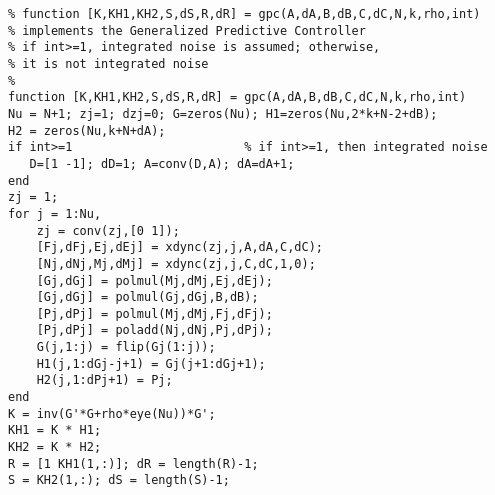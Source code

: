 \begin{verbatim}
% function [K,KH1,KH2,S,dS,R,dR] = gpc(A,dA,B,dB,C,dC,N,k,rho,int)
% implements the Generalized Predictive Controller
% if int>=1, integrated noise is assumed; otherwise,
% it is not integrated noise
%
function [K,KH1,KH2,S,dS,R,dR] = gpc(A,dA,B,dB,C,dC,N,k,rho,int)
Nu = N+1; zj=1; dzj=0; G=zeros(Nu); H1=zeros(Nu,2*k+N-2+dB);
H2 = zeros(Nu,k+N+dA);
if int>=1                        % if int>=1, then integrated noise
   D=[1 -1]; dD=1; A=conv(D,A); dA=dA+1; 
end
zj = 1;
for j = 1:Nu,
    zj = conv(zj,[0 1]);
    [Fj,dFj,Ej,dEj] = xdync(zj,j,A,dA,C,dC);
    [Nj,dNj,Mj,dMj] = xdync(zj,j,C,dC,1,0);
    [Gj,dGj] = polmul(Mj,dMj,Ej,dEj);
    [Gj,dGj] = polmul(Gj,dGj,B,dB);
    [Pj,dPj] = polmul(Mj,dMj,Fj,dFj);
    [Pj,dPj] = poladd(Nj,dNj,Pj,dPj);
    G(j,1:j) = flip(Gj(1:j));
    H1(j,1:dGj-j+1) = Gj(j+1:dGj+1); 
    H2(j,1:dPj+1) = Pj;
end
K = inv(G'*G+rho*eye(Nu))*G';
KH1 = K * H1;
KH2 = K * H2;
R = [1 KH1(1,:)]; dR = length(R)-1;
S = KH2(1,:); dS = length(S)-1;
\end{verbatim}

